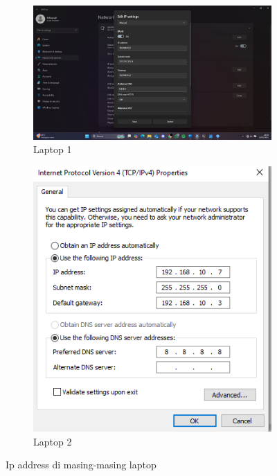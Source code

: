 \begin{figure}[H]
    \centering
    \begin{subfigure}[b]{0.3\linewidth}
      \centering
      \includegraphics[width=\linewidth]{image/wb6.jpg}
      \caption{Laptop 1}
    \end{subfigure}
    \hspace{1cm}
    \begin{subfigure}[b]{0.3\linewidth}
      \centering
      \includegraphics[width=\linewidth]{image/wb3.png}
      \caption{Laptop 2}
    \end{subfigure}
    \caption{Ip address di masing-masing laptop}
\end{figure}
